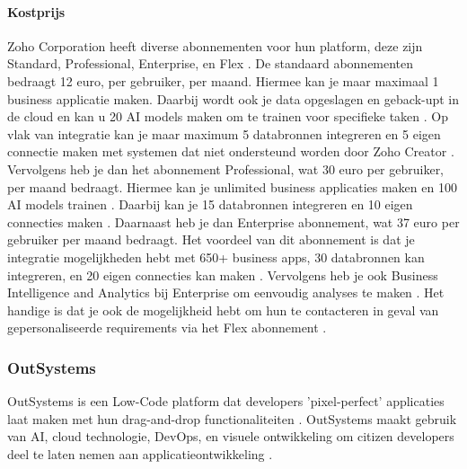 \paragraph{Kostprijs}
Zoho Corporation heeft diverse abonnementen voor hun platform, deze zijn Standard, Professional, Enterprise, en Flex \autocite{ZohoCorporation2024}.
De standaard abonnementen bedraagt 12 euro, per gebruiker, per maand. Hiermee kan je maar maximaal 1 business applicatie maken.
Daarbij wordt ook je data opgeslagen en geback-upt in de cloud en kan u 20 AI models maken om te trainen voor specifieke taken \autocite{ZohoCorporation2024}. Op vlak van integratie
kan je maar maximum 5 databronnen integreren en 5 eigen connectie maken met systemen dat niet ondersteund worden door Zoho Creator \autocite{ZohoCorporation2024}. Vervolgens heb je dan het
abonnement Professional, wat 30 euro per gebruiker, per maand bedraagt. Hiermee kan je unlimited business applicaties maken en 100 AI models trainen \autocite{ZohoCorporation2024}. 
Daarbij kan je 15 databronnen integreren en 10 eigen connecties maken \autocite{ZohoCorporation2024}. Daarnaast heb je dan Enterprise abonnement, wat 37 euro per gebruiker per maand bedraagt.
Het voordeel van dit abonnement is dat je integratie mogelijkheden hebt met 650+ business apps, 30 databronnen kan integreren, en 20 eigen connecties kan maken \autocite{ZohoCorporation2024}. Vervolgens heb je ook
Business Intelligence and Analytics bij Enterprise om eenvoudig analyses te maken \autocite{ZohoCorporation2024}. Het handige is dat je ook de mogelijkheid hebt om hun te contacteren in geval 
van gepersonaliseerde requirements via het Flex abonnement \autocite{ZohoCorporation2024}.

\subsubsection*{OutSystems}
OutSystems is een Low-Code platform dat developers 'pixel-perfect' applicaties laat maken met hun drag-and-drop functionaliteiten \autocite{Ranosys2023} \autocite{Payne2023}.
OutSystems maakt gebruik van AI, cloud technologie, DevOps, en visuele ontwikkeling om citizen developers deel te laten nemen aan applicatieontwikkeling \autocite{Ranosys2023}.

